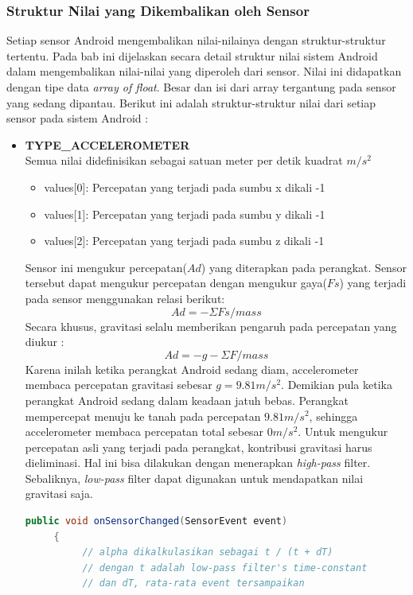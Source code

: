 \subsubsection{Struktur Nilai yang Dikembalikan oleh Sensor}
\label{sssec:struktur_nilai_yang_dikembalikan_oleh_sensor}
Setiap sensor Android mengembalikan nilai-nilainya dengan struktur-struktur tertentu. Pada bab ini dijelaskan secara detail struktur nilai sistem Android dalam mengembalikan nilai-nilai yang diperoleh dari sensor. Nilai ini didapatkan dengan tipe data \textit{array of float}. Besar dan isi dari array tergantung pada sensor yang sedang dipantau. Berikut ini adalah struktur-struktur nilai dari setiap sensor pada sistem Android :\\
\begin{itemize}
	\item \textbf{TYPE\_ACCELEROMETER}\\
Semua nilai didefinisikan sebagai satuan meter per detik kuadrat \(m/s^2\)
\begin{itemize}
	\item values[0]: Percepatan yang terjadi pada sumbu x dikali -1
	\item values[1]: Percepatan yang terjadi pada sumbu y dikali -1
	\item values[2]: Percepatan yang terjadi pada sumbu z dikali -1
\end{itemize}
Sensor ini mengukur percepatan(\(Ad\)) yang diterapkan pada perangkat. Sensor tersebut dapat mengukur percepatan dengan mengukur gaya(\(Fs\)) yang terjadi pada sensor menggunakan relasi berikut:
\[
	Ad = -\Sigma Fs / mass
\]
Secara khusus, gravitasi selalu memberikan pengaruh pada percepatan yang diukur :
\[
	Ad =  -g -\Sigma F / mass
\]
Karena inilah ketika perangkat Android sedang diam, accelerometer membaca percepatan gravitasi sebesar \(g = 9.81m/s^2\).
Demikian pula ketika perangkat Android sedang dalam keadaan jatuh bebas. Perangkat mempercepat menuju ke tanah pada percepatan \(9.81 m/s^2\), sehingga accelerometer membaca percepatan total sebesar \( 0 m/s^2\). 
Untuk mengukur percepatan asli yang terjadi pada perangkat, kontribusi gravitasi harus dieliminasi. Hal ini bisa dilakukan dengan menerapkan \textit{high-pass} filter. Sebaliknya, \textit{low-pass} filter dapat digunakan untuk mendapatkan nilai gravitasi saja. 
\begin{lstlisting}[caption={Implementasi \textit{low-pass} filter},label={lst:low-pass-filter},language=java]
	 public void onSensorChanged(SensorEvent event)
     {
          // alpha dikalkulasikan sebagai t / (t + dT)
          // dengan t adalah low-pass filter's time-constant
          // dan dT, rata-rata event tersampaikan


\end{lstlisting}
\end{itemize}
